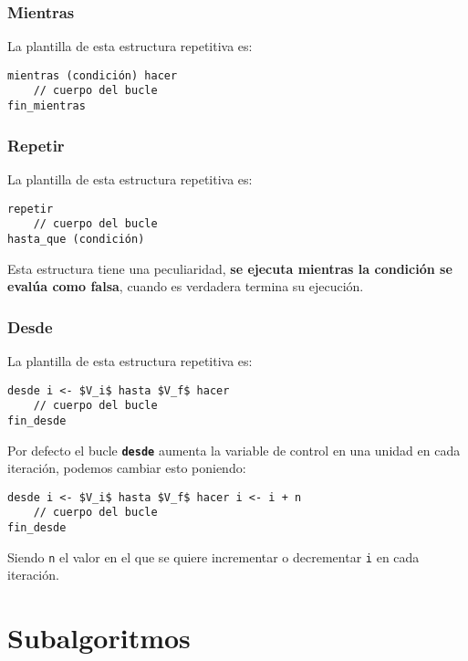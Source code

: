 \documentclass{article}
\newcommand{\pkeyword}[1]{\textcolor{azulpseudo}{\texttt{\textbf{#1}}}}
\begin{document}
\subsubsection{Mientras}
La plantilla de esta estructura repetitiva es:
\begin{lstlisting}[language = pseudocodigoesp]
mientras (condición) hacer
    // cuerpo del bucle
fin_mientras
\end{lstlisting}
\subsubsection{Repetir}
La plantilla de esta estructura repetitiva es:
\begin{lstlisting}[language = pseudocodigoesp]
repetir
    // cuerpo del bucle
hasta_que (condición)
\end{lstlisting}

Esta estructura tiene una peculiaridad, \textbf{se ejecuta mientras la condición se evalúa como falsa}, cuando es verdadera termina su ejecución.
\subsubsection{Desde}
La plantilla de esta estructura repetitiva es:
\begin{lstlisting}[language = pseudocodigoesp, mathescape=true]
desde i <- $V_i$ hasta $V_f$ hacer
    // cuerpo del bucle
fin_desde
\end{lstlisting}

Por defecto el bucle \pkeyword{desde} aumenta la variable de control en una unidad en cada iteración, podemos cambiar esto poniendo:

\begin{lstlisting}[language = pseudocodigoesp, mathescape=true]
desde i <- $V_i$ hasta $V_f$ hacer i <- i + n
    // cuerpo del bucle
fin_desde
\end{lstlisting}

Siendo \texttt{n} el valor en el que se quiere incrementar o decrementar \texttt{i} en cada iteración.

\section{Subalgoritmos}
\end{document}

